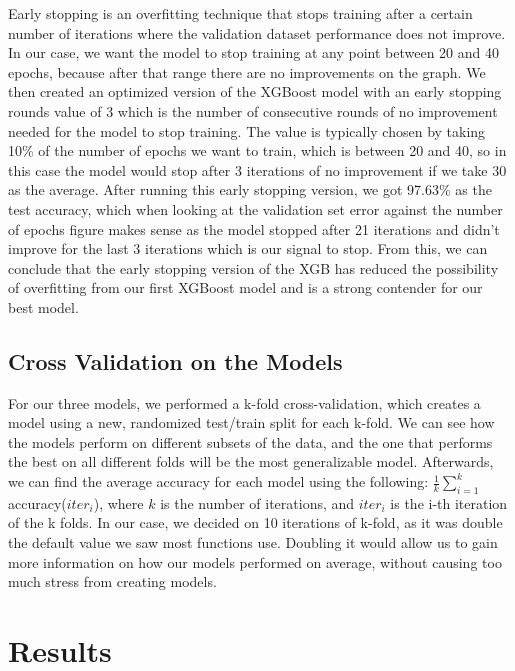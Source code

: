\documentclass[11pt]{article}
\begin{document}
    Early stopping is an overfitting technique that stops training after a certain number of iterations where the validation dataset performance does not improve. In our case, we want the model to stop training at any point between 20 and 40 epochs, because after that range there are no improvements on the graph. We then created an optimized version of the XGBoost model with an early stopping rounds value of 3 which is the number of consecutive rounds of no improvement needed for the model to stop training. The value is typically chosen by taking 10\% of the number of epochs we want to train, which is between 20 and 40, so in this case the model would stop after 3 iterations of no improvement if we take 30 as the average. After running this early stopping version, we got 97.63\% as the test accuracy, which when looking at the validation set error against the number of epochs figure makes sense as the model stopped after 21 iterations and didn’t improve for the last 3 iterations which is our signal to stop. From this, we can conclude that the early stopping version of the XGB has reduced the possibility of overfitting from our first XGBoost model and is a strong contender for our best model.

    \subsection{Cross Validation on the Models}
    For our three models, we performed a k-fold cross-validation, which creates a model using a new, randomized test/train split for each k-fold. We can see how the models perform on different subsets of the data, and the one that performs the best on all different folds will be the most generalizable model. Afterwards, we can find the average accuracy for each model using the following: $\frac{1}{k}\sum^k_{i=1}$accuracy($iter_i$), where $k$ is the number of iterations, and $iter_i$ is the i-th iteration of the k folds. In our case, we decided on 10 iterations of k-fold, as it was double the default value we saw most functions use. Doubling it would allow us to gain more information on how our models performed on average, without causing too much stress from creating models. 

\section{Results}
\end{document}
